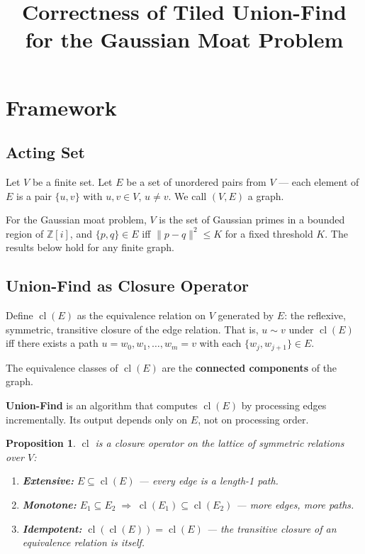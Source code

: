\documentclass[11pt]{article}
\title{Correctness of Tiled Union-Find for the Gaussian Moat Problem}
\author{}
\date{}
\newtheorem{proposition}{Proposition}
\begin{document}
\maketitle

\section{Framework}

\subsection{Acting Set}

Let $V$ be a finite set. Let $E$ be a set of unordered pairs from $V$
--- each element of $E$ is a pair $\{u, v\}$ with $u, v \in V$,
$u \ne v$. We call $(V, E)$ a graph.

For the Gaussian moat problem, $V$ is the set of Gaussian primes in a
bounded region of $\mathbb{Z}[i]$, and $\{p, q\} \in E$ iff
$\|p - q\|^2 \le K$ for a fixed threshold $K$.
The results below hold for any finite graph.

\subsection{Union-Find as Closure Operator}

Define $\operatorname{cl}(E)$ as the equivalence relation on $V$
generated by $E$: the reflexive, symmetric, transitive closure of the
edge relation. That is, $u \sim v$ under $\operatorname{cl}(E)$ iff
there exists a path $u = w_0, w_1, \ldots, w_m = v$ with each
$\{w_j, w_{j+1}\} \in E$.

The equivalence classes of $\operatorname{cl}(E)$ are the
\textbf{connected components} of the graph.

\textbf{Union-Find} is an algorithm that computes $\operatorname{cl}(E)$
by processing edges incrementally. Its output depends only on $E$, not
on processing order.

\begin{proposition}
\label{prop:closure-operator}
$\operatorname{cl}$ is a closure operator on the lattice of symmetric
relations over $V$:
\begin{enumerate}
    \item \textbf{Extensive:} $E \subseteq \operatorname{cl}(E)$
          \quad--- every edge is a length-1 path.
    \item \textbf{Monotone:} $E_1 \subseteq E_2 \;\Rightarrow\;
          \operatorname{cl}(E_1) \subseteq \operatorname{cl}(E_2)$
          \quad--- more edges, more paths.
    \item \textbf{Idempotent:}
          $\operatorname{cl}(\operatorname{cl}(E)) = \operatorname{cl}(E)$
          \quad--- the transitive closure of an equivalence relation is
          itself.
\end{enumerate}
\end{proposition}
\end{document}
